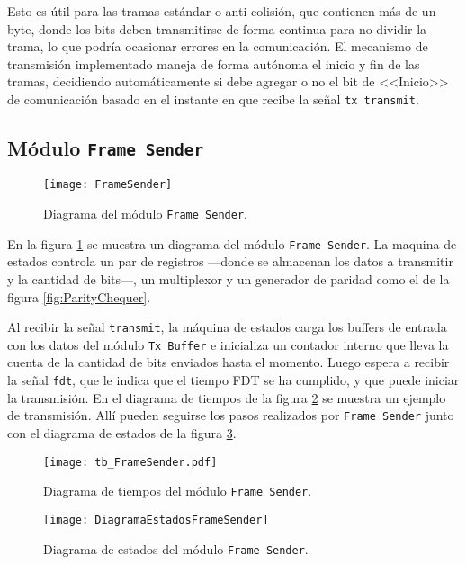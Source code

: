 Esto es útil para las tramas estándar o anti-colisión, que contienen 
más de un byte, donde los bits deben transmitirse de forma continua 
para no dividir la trama, lo que podría ocasionar errores en la 
comunicación. El mecanismo de transmisión implementado maneja de 
forma autónoma el inicio y fin de las tramas, decidiendo 
automáticamente si debe agregar o no el bit de <<Inicio>> de 
comunicación basado en el instante en que recibe la señal 
\lstinline{tx transmit}.


\subsection{Módulo \lstinline{Frame Sender}}

\begin{figure}
	\centering
	\texttt{[image: FrameSender]}
	\caption{Diagrama del módulo \lstinline{Frame Sender}.}
	\label{fig:FrameSenderDiagBloques}
\end{figure}

En la figura \ref{fig:FrameSenderDiagBloques} se muestra un diagrama 
del módulo \lstinline{Frame Sender}. La maquina de estados controla un 
par de registros ---donde se almacenan los datos a transmitir y la 
cantidad de bits---, un multiplexor y un generador de paridad como el 
de la figura \ref{fig:ParityChequer}.

Al recibir la señal \lstinline{transmit}, la máquina de estados 
carga los buffers de entrada con los datos del módulo 
\lstinline{Tx Buffer} e inicializa un contador interno que lleva la 
cuenta de la cantidad de bits enviados hasta el momento. Luego espera 
a recibir la señal \lstinline{fdt}, que le indica que el tiempo FDT se
ha cumplido, y que puede iniciar la transmisión. En el diagrama de 
tiempos de la figura \ref{fig:FrameSenderDiagTiempos} se muestra un 
ejemplo de transmisión. Allí pueden seguirse los pasos realizados por 
\lstinline{Frame Sender} junto con el diagrama de estados de la figura 
\ref{fig:FrameSenderDiagEstados}.

\begin{figure}
	\centering
	\texttt{[image: tb\_FrameSender.pdf]}
	\caption{Diagrama de tiempos del módulo \lstinline{Frame Sender}.}
	\label{fig:FrameSenderDiagTiempos}
\end{figure}

\begin{figure}
	\centering
	\texttt{[image: DiagramaEstadosFrameSender]}
	\caption{Diagrama de estados del módulo \lstinline{Frame Sender}.}
	\label{fig:FrameSenderDiagEstados}
\end{figure}


